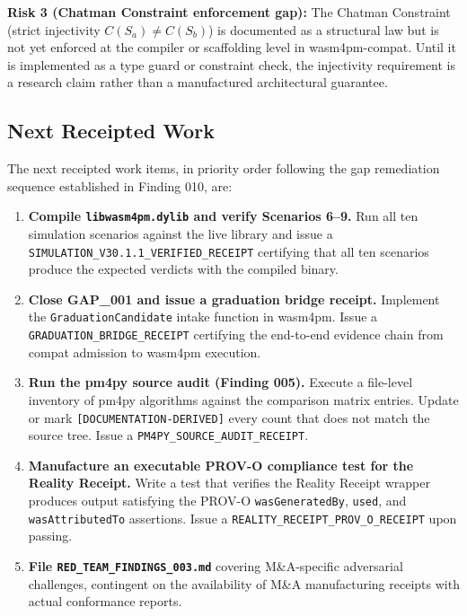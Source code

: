 \textbf{Risk 3 (Chatman Constraint enforcement gap):} The Chatman Constraint (strict
injectivity $C(S_a) \neq C(S_b)$) is documented as a structural law but is not yet enforced
at the compiler or scaffolding level in wasm4pm-compat. Until it is implemented as a type
guard or constraint check, the injectivity requirement is a research claim rather than a
manufactured architectural guarantee.

\subsection{Next Receipted Work}
\label{sec:adversarial-questions-next}

The next receipted work items, in priority order following the gap remediation sequence
established in Finding 010, are:

\begin{enumerate}
  \item \textbf{Compile \texttt{libwasm4pm.dylib} and verify Scenarios 6--9.} Run all ten
        simulation scenarios against the live library and issue a
        \texttt{SIMULATION\_V30.1.1\_VERIFIED\_RECEIPT} certifying that all ten scenarios
        produce the expected verdicts with the compiled binary.

  \item \textbf{Close GAP\_001 and issue a graduation bridge receipt.} Implement the
        \texttt{GraduationCandidate} intake function in wasm4pm. Issue a
        \texttt{GRADUATION\_BRIDGE\_RECEIPT} certifying the end-to-end evidence chain from
        compat admission to wasm4pm execution.

  \item \textbf{Run the pm4py source audit (Finding 005).} Execute a file-level inventory of
        pm4py algorithms against the comparison matrix entries. Update or mark
        \texttt{[DOCUMENTATION-DERIVED]} every count that does not match the source tree.
        Issue a \texttt{PM4PY\_SOURCE\_AUDIT\_RECEIPT}.

  \item \textbf{Manufacture an executable PROV-O compliance test for the Reality Receipt.}
        Write a test that verifies the Reality Receipt wrapper produces output satisfying the
        PROV-O \texttt{wasGeneratedBy}, \texttt{used}, and \texttt{wasAttributedTo}
        assertions. Issue a \texttt{REALITY\_RECEIPT\_PROV\_O\_RECEIPT} upon passing.

  \item \textbf{File \texttt{RED\_TEAM\_FINDINGS\_003.md}} covering M\&A-specific adversarial
        challenges, contingent on the availability of M\&A manufacturing receipts with actual
        conformance reports.
\end{enumerate}
